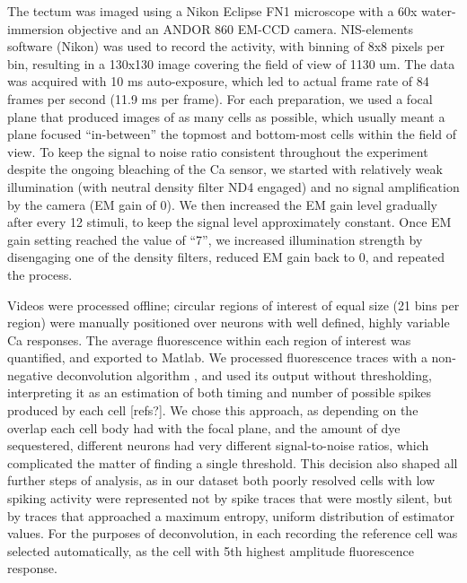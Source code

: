\documentclass{article}
\begin{document}
The tectum was imaged using a Nikon Eclipse FN1 microscope with a 60x water-immersion objective and an ANDOR 860 EM-CCD camera. NIS-elements software (Nikon) was used to record the activity, with binning of 8x8 pixels per bin, resulting in a 130x130 image covering the field of view of 1130 um. The data was acquired with 10 ms auto-exposure, which led to actual frame rate of 84 frames per second (11.9 ms per frame). For each preparation, we used a focal plane that produced images of as many cells as possible, which usually meant a plane focused “in-between” the topmost and bottom-most cells within the field of view. To keep the signal to noise ratio consistent throughout the experiment despite the ongoing bleaching of the Ca sensor, we started with relatively weak illumination (with neutral density filter ND4 engaged) and no signal amplification by the camera (EM gain of 0). We then increased the EM gain level gradually after every 12 stimuli, to keep the signal level approximately constant. Once EM gain setting reached the value of “7”, we increased illumination strength by disengaging one of the density filters, reduced EM gain back to 0, and repeated the process.

Videos were processed offline; circular regions of interest of equal size (21 bins per region) were manually positioned over neurons with well defined, highly variable Ca responses. The average fluorescence within each region of interest was quantified, and exported to Matlab. We processed fluorescence traces with a non-negative deconvolution algorithm \citep{vogelstein2010oopsi}, and used its output without thresholding, interpreting it as an estimation of both timing and number of possible spikes produced by each cell [refs?]. We chose this approach, as depending on the overlap each cell body had with the focal plane, and the amount of dye sequestered, different neurons had very different signal-to-noise ratios, which complicated the matter of finding a single threshold. This decision also shaped all further steps of analysis, as in our dataset both poorly resolved cells with low spiking activity were represented not by spike traces that were mostly silent, but by traces that approached a maximum entropy, uniform distribution of estimator values. For the purposes of deconvolution, in each recording the reference cell was selected automatically, as the cell with 5th highest amplitude fluorescence response.
\end{document}
